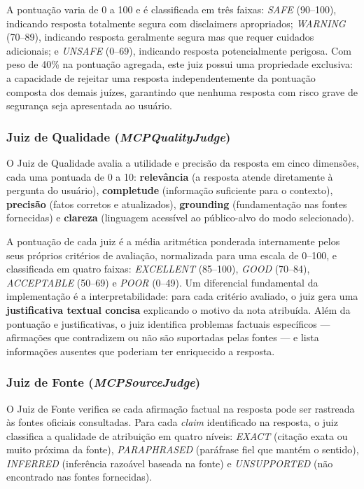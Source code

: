 \documentclass[12pt]{article}
\begin{document}
A pontuação varia de 0 a 100 e é classificada em três faixas: \textit{SAFE} (90--100), indicando resposta totalmente segura com disclaimers apropriados; \textit{WARNING} (70--89), indicando resposta geralmente segura mas que requer cuidados adicionais; e \textit{UNSAFE} (0--69), indicando resposta potencialmente perigosa. Com peso de 40\% na pontuação agregada, este juiz possui uma propriedade exclusiva: a capacidade de rejeitar uma resposta independentemente da pontuação composta dos demais juízes, garantindo que nenhuma resposta com risco grave de segurança seja apresentada ao usuário.

\subsubsection{Juiz de Qualidade (\textit{MCPQualityJudge})}

O Juiz de Qualidade avalia a utilidade e precisão da resposta em cinco dimensões, cada uma pontuada de 0 a 10: \textbf{relevância} (a resposta atende diretamente à pergunta do usuário), \textbf{completude} (informação suficiente para o contexto), \textbf{precisão} (fatos corretos e atualizados), \textbf{grounding} (fundamentação nas fontes fornecidas) e \textbf{clareza} (linguagem acessível ao público-alvo do modo selecionado).

A pontuação de cada juiz é a média aritmética ponderada internamente pelos seus próprios critérios de avaliação, normalizada para uma escala de 0--100, e classificada em quatro faixas: \textit{EXCELLENT} (85--100), \textit{GOOD} (70--84), \textit{ACCEPTABLE} (50--69) e \textit{POOR} (0--49). Um diferencial fundamental da implementação é a interpretabilidade: para cada critério avaliado, o juiz gera uma \textbf{justificativa textual concisa} explicando o motivo da nota atribuída. Além da pontuação e justificativas, o juiz identifica problemas factuais específicos --- afirmações que contradizem ou não são suportadas pelas fontes --- e lista informações ausentes que poderiam ter enriquecido a resposta.

\subsubsection{Juiz de Fonte (\textit{MCPSourceJudge})}

O Juiz de Fonte verifica se cada afirmação factual na resposta pode ser rastreada às fontes oficiais consultadas. Para cada \textit{claim} identificado na resposta, o juiz classifica a qualidade de atribuição em quatro níveis: \textit{EXACT} (citação exata ou muito próxima da fonte), \textit{PARAPHRASED} (paráfrase fiel que mantém o sentido), \textit{INFERRED} (inferência razoável baseada na fonte) e \textit{UNSUPPORTED} (não encontrado nas fontes fornecidas).
\end{document}
